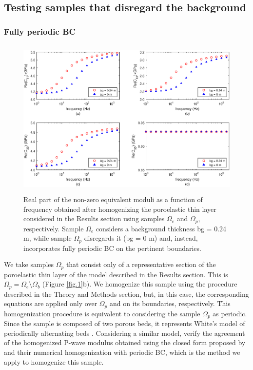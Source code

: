 \documentclass[draft]{agujournal2019}
\begin{document}
\subsection{Testing samples that disregard the background}

\subsubsection{Fully periodic BC}
\begin{figure}[!ht]
\centering
        \includegraphics[width= 120mm, height=80mm]{Figure4.eps}
\caption{Real part of the non-zero equivalent moduli as a function of frequency obtained after homogenizing the poroelastic thin layer considered in the Results section using samples $\Omega_e$ and $\Omega_p$, respectively. Sample $\Omega_e$ considers a background thickness bg = 0.24 m, while sample $\Omega_p$ disregards it (bg = 0 m) and, instead, incorporates fully periodic BC on the pertinent boundaries. }
\label{fig.4}
\end{figure}

We take samples $\Omega_p$ that consist only of a representative section of the poroelastic thin layer of the model described in the Results section. This is $\Omega_p = \Omega_e  \setminus \Omega_b $ (Figure \ref{fig.1}b). We homogenize this sample using the procedure described in the Theory and Methods section, but, in this case, the corresponding equations are applied only  over $\Omega_p$ and on its boundaries, respectively. 
This homogenization procedure is equivalent to considering the sample $\Omega_p$ as periodic. Since the sample is composed of two porous beds, it represents White's model of periodically alternating beds \cite{White1975}. Considering a similar model,  verify the agreement of the homogenized P-wave modulus obtained using the closed form proposed by  and their numerical homogenization with periodic BC, which is the method we apply to homogenize this sample.
\end{document}
